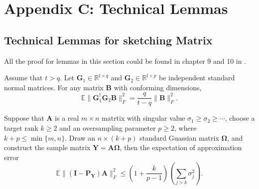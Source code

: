\section{Appendix C: Technical Lemmas}
\subsection{Technical Lemmas for sketching Matrix}
All the proof for lemmas in this section could be found in chapter 9 and 10 in \cite{halko2011finding}.
\begin{lem}
\label{lemma:expectation_inverse_gaussian}
Assume that $t>q$. Let $\mathbf{G}_1\in \mathbb{R}^{t\times q}$ and $\mathbf{G}_2\in \mathbb{R}^{t\times p}$ be independent standard normal matrices. For any matrix $\mathbf{B}$ with conforming dimensions, 
\begin{equation}
\mathbb{E} \|\mathbf{G}_1^\dag \mathbf{G}_2 \mathbf{B}\|_F^2 = \frac{q}{t-q} \|\mathbf{B}\|_F^2. 
\end{equation}
\end{lem}

\begin{lem}
\label{lemma:sketchy_column_space_err}
Suppose that $\mathbf{A}$ is a real $m\times n$ matrtix with singular value $\sigma_1\ge \sigma_2\ge \cdots$, choose a target rank $k\ge 2$ and an oversampling parameter $p\ge 2$, where $k+p\le \min\{m,n\}$. Draw an $n\times (k+p)$ standard Guassian matrix $\mathbf{\Omega}$, and construct the sample matrix $\mathbf{Y}=\mathbf{A\Omega}$, then the expectation of approximation error 
\begin{equation}
\mathbb{E}\|(\mathbf{I} - \mathbf{P_Y})\mathbf{A}\|_F^2\le (1+\frac{k}{p-1})(\sum_{j>k} \sigma_j^2).
\end{equation}
\end{lem}


